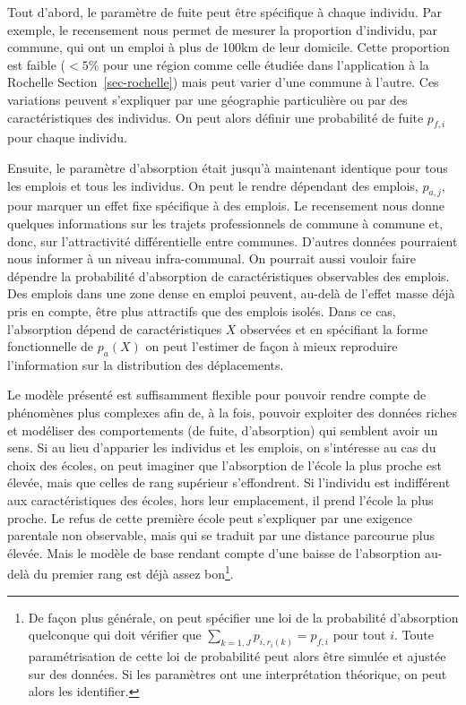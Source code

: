 \documentclass[
  10pt,
  a4paper,
  numbers=noendperiod,
  DIV=12]{scrartcl}
\begin{document}
Tout d'abord, le paramètre de fuite peut être spécifique à chaque
individu. Par exemple, le recensement nous permet de mesurer la
proportion d'individu, par commune, qui ont un emploi à plus de 100km de
leur domicile. Cette proportion est faible (\(<5\%\) pour une région
comme celle étudiée dans l'application à la Rochelle
Section~\ref{sec-rochelle}) mais peut varier d'une commune à l'autre.
Ces variations peuvent s'expliquer par une géographie particulière ou
par des caractéristiques des individus. On peut alors définir une
probabilité de fuite \(p_{f,i}\) pour chaque individu.

Ensuite, le paramètre d'absorption était jusqu'à maintenant identique
pour tous les emplois et tous les individus. On peut le rendre dépendant
des emplois, \(p_{a,j}\), pour marquer un effet fixe spécifique à des
emplois. Le recensement nous donne quelques informations sur les trajets
professionnels de commune à commune et, donc, sur l'attractivité
différentielle entre communes. D'autres données pourraient nous informer
à un niveau infra-communal. On pourrait aussi vouloir faire dépendre la
probabilité d'absorption de caractéristiques observables des emplois.
Des emplois dans une zone dense en emploi peuvent, au-delà de l'effet
masse déjà pris en compte, être plus attractifs que des emplois isolés.
Dans ce cas, l'absorption dépend de caractéristiques \(X\) observées et
en spécifiant la forme fonctionnelle de \(p_a(X)\) on peut l'estimer de
façon à mieux reproduire l'information sur la distribution des
déplacements.

Le modèle présenté est suffisamment flexible pour pouvoir rendre compte
de phénomènes plus complexes afin de, à la fois, pouvoir exploiter des
données riches et modéliser des comportements (de fuite, d'absorption)
qui semblent avoir un sens. Si au lieu d'apparier les individus et les
emplois, on s'intéresse au cas du choix des écoles, on peut imaginer que
l'absorption de l'école la plus proche est élevée, mais que celles de
rang supérieur s'effondrent. Si l'individu est indifférent aux
caractéristiques des écoles, hors leur emplacement, il prend l'école la
plus proche. Le refus de cette première école peut s'expliquer par une
exigence parentale non observable, mais qui se traduit par une distance
parcourue plus élevée. Mais le modèle de base rendant compte d'une
baisse de l'absorption au-delà du premier rang est déjà assez
bon\footnote{De façon plus générale, on peut spécifier une loi de la
  probabilité d'absorption quelconque qui doit vérifier que
  \(\sum_{k=1,J} p_{i,r_i(k)} = p_{f,i}\) pour tout \(i\). Toute
  paramétrisation de cette loi de probabilité peut alors être simulée et
  ajustée sur des données. Si les paramètres ont une interprétation
  théorique, on peut alors les identifier.}.
\end{document}
